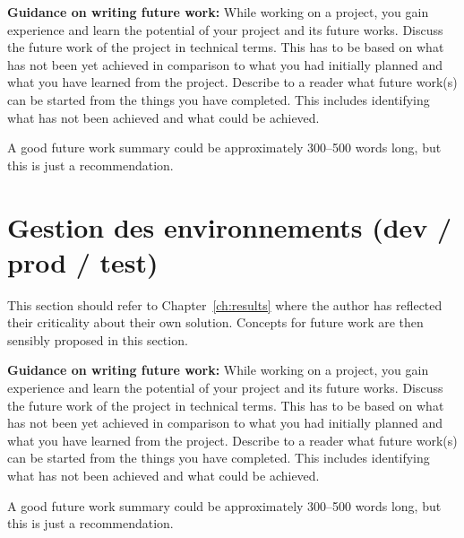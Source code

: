\textbf{Guidance on writing future work:} While working on a project, you gain experience and learn the potential of your project and its future works. Discuss the future work of the project in technical terms. This has to be based on what has not been yet achieved in comparison to what you had initially planned and what you have learned from the project. Describe to a reader what future work(s) can be started from the things you have completed. This includes identifying what has not been achieved and what could be achieved. 



A good future work summary could be approximately 300--500 words long, but this is just a recommendation.


\section{Gestion des environnements (dev / prod / test)}
This section should refer to Chapter~\ref{ch:results} where the author has reflected their criticality about their own solution. Concepts for future work are then sensibly proposed in this section.

\textbf{Guidance on writing future work:} While working on a project, you gain experience and learn the potential of your project and its future works. Discuss the future work of the project in technical terms. This has to be based on what has not been yet achieved in comparison to what you had initially planned and what you have learned from the project. Describe to a reader what future work(s) can be started from the things you have completed. This includes identifying what has not been achieved and what could be achieved. 



A good future work summary could be approximately 300--500 words long, but this is just a recommendation.